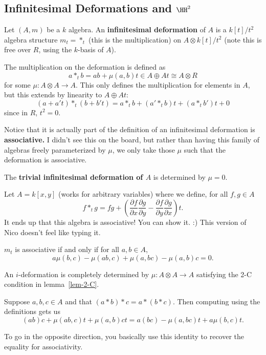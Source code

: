 \documentclass[12pt]{article}
\begin{document}
\subsection{Infinitesimal Deformations and $\HH^2$}
\begin{defn}
	Let $(A,m)$ be a $k$ algebra. An \textbf{infinitesimal deformation} of $A$ is a $k[t]/t^2$ algebra
	structure $m_t=\ast_t$ (this is the multiplication) on $A\otimes k[t]/t^2$ (note this is free over $R$, using the $k$-basis of $A$).

	The multiplication on the deformation is defined as 
	\[a\ast_t b=ab+\mu(a,b)t\in A\oplus At\cong A\otimes R\]
	for some $\mu:A\otimes A\to A$. This only defines the multiplication for elements in $A$, but this extends by linearity to $A\oplus At:$
	\[(a+a't)\ast_t(b+b't)=a\ast_t b+(a'\ast_t b)t+(a\ast_t b')t+0\]
	since in $R$, $t^2=0$.
\end{defn}
\begin{rmk}
	Notice that it is actually part of the definition of an infinitesimal deformation is \textbf{associative.}
	I didn't see this on the board, but rather than having this family of algebras freely parameterized by $\mu$, 
	we only take those $\mu$ such that the deformation is associative.
\end{rmk}
\begin{ex}
	The \textbf{trivial infinitesimal deformation of $A$} is determined by $\mu=0$.
\end{ex}
\begin{ex}
	Let $A=k[x,y]$ (works for arbitrary variables) where we define, for all $f,g\in A$
	\[f\ast_t g=fg+\left(\frac{\partial f}{\partial x}\frac{\partial g}{\partial y}-\frac{\partial f}{\partial y}\frac{\partial g}{\partial x}\right)t.\]
	It ends up that this algebra is associative! You can show it. :) This version of Nico doesn't feel like typing it.
\end{ex}
\begin{lem}[Condition 2-C]\label{lem-2-C}
	$m_t$ is associative if and only if for all $a,b\in A$,
	\[a\mu(b,c)-\mu(ab,c)+\mu(a,bc)-\mu(a,b)c=0.\]
\end{lem}
\begin{lem}
	An $i$-deformation is completely determined by $\mu:A\otimes A\to A$ satisfying the 2-C condition in lemma~\ref{lem-2-C}.
\end{lem}
\begin{prf}
	Suppose $a,b,c\in A$ and that $(a\ast b)\ast c=a\ast(b\ast c)$. Then computing using the definitions gets us
	\[(ab)c+\mu(ab,c)t+\mu(a,b)ct=a(bc)-\mu(a,bc)t+a\mu(b,c)t.\]

	To go in the opposite direction, you basically use this identity to recover the equality for associativity.
\end{prf}
\end{document}
